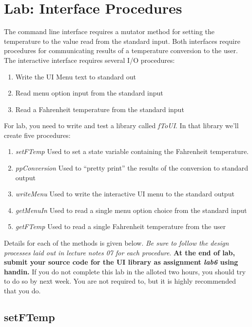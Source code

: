 \documentclass[]{tufte-handout}
\begin{document}
\section{Lab: Interface Procedures}

The command line interface requires a mutator method for setting the temperature to the value read from the standard input. Both interfaces require procedures for communicating results of a temperature conversion to the user. The interactive interface requires several I/O procedures:
\begin{enumerate}
\item Write the UI Menu text to standard out
\item Read menu option input from the standard input
\item Read a Fahrenheit temperature from the standard input
\end{enumerate}

For lab, you need to write and test a library called \textit{fToUI}. In that library we'll create five procedures:
\begin{enumerate}
\item \textit{setFTemp} Used to set a state variable containing the Fahrenheit temperature. 
\item \textit{ppConversion} Used to ``pretty print'' the results of the conversion to standard output
\item \textit{writeMenu} Used to write the interactive UI menu to the standard output
\item \textit{getMenuIn} Used to read a single menu option choice from the standard input
\item \textit{getFTemp} Used to read a single Fahrenheit temperature from the user
\end{enumerate}

Details for each of the methods is given below. \textit{Be sure to follow the design processes laid out in lecture notes 07 for each procedure}. \textbf{At the end of lab, submit your source code for the UI library as assignment \textit{lab6} using handin.} If you do not complete this lab in the alloted two hours, you should try to do so by next week. You are not required to, but it is highly recommended that you do. 

\subsection{setFTemp}
\end{document}
